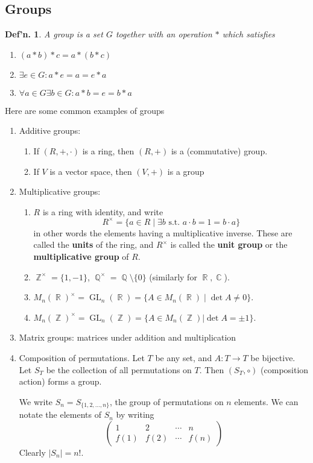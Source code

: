 \documentclass[12pt, a4paper]{book}
\DeclareMathOperator{\Q}{\mathbb{Q}}
\DeclareMathOperator{\Z}{\mathbb{Z}}
\DeclareMathOperator{\R}{\mathbb{R}}
\DeclareMathOperator{\C}{\mathbb{C}}
\DeclareMathOperator{\GL}{GL}
\newtheorem{definition}[theorem]{Def'n.}
\theoremstyle{nonumberplain}
\begin{document}
\subsection{Groups}
\begin{definition}
    A group is a set $G$ together with an operation $*$ which satisfies
    \begin{enumerate}
        \item $(a*b)*c=a*(b*c)$
        \item $\exists e\in G:a*e=a=e*a$
        \item $\forall a\in G\exists b\in G:a*b=e=b*a$
    \end{enumerate}
\end{definition}
Here are some common examples of groups
\begin{enumerate}
    \item Additive groups:
        \begin{enumerate}
            \item If $(R,+,\cdot)$ is a ring, then $(R,+)$ is a (commutative) group.
            \item If $V$ is a vector space, then $(V,+)$ is a group
        \end{enumerate}
    \item Multiplicative groups:
        \begin{enumerate}
            \item $R$ is a ring with identity, and write
                \[R^\times=\{a\in R\mid \exists b\text{ s.t. }a\cdot b = 1 = b\cdot a\}\]
                in other words the elements having a multiplicative inverse.
                These are called the \textbf{units} of the ring, and $R^\times$ is called the \textbf{unit group} or the \textbf{multiplicative group} of $R$.
            \item $\Z^\times=\{1,-1\}$, $\Q^\times=\Q\setminus\{0\}$ (similarly for $\R,\C$).
            \item $M_n(\R)^\times = \GL_n(\R)=\{A\in M_n(\R)\mid \det A\neq 0\}$.
            \item $M_n(\Z)^\times = \GL_n(\Z)=\{A\in M_n(\Z)|\det A=\pm 1\}$.
        \end{enumerate}
    \item Matrix groups: matrices under addition and multiplication
    \item Composition of permutations.
        Let $T$ be any set, and $A:T\to T$ be bijective.
        Let $S_T$ be the collection of all permutations on $T$.
        Then $(S_T,\circ)$ (composition action) forms a group.

        We write $S_n=S_{\{1,2,\ldots,n\}}$, the group of permutations on $n$ elements.
        We can notate the elements of $S_n$ by writing
        \[
            \begin{pmatrix}
                1&2&\cdots&n\\
                f(1)&f(2)&\cdots&f(n)
            \end{pmatrix}
        \]
        Clearly $|S_n|=n!$.
\end{enumerate}
\end{document}
